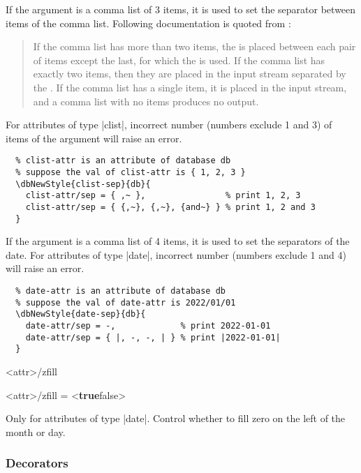 \documentclass[full]{l3doc}
\def\orbar{\textup{\textbar}}
\def\defaultval#1{\textbf{\textup{#1}}}
\def\TTF{\defaultval{true}\orbar false}
\begin{document}
\begin{documentation}
  If the argument is a comma list of 3 items, it is used to set the separator
  between items of the comma list. Following documentation is quoted from
  :
  \begin{quote}
    If the comma list has more than two items, the  is placed between each pair of items except the last, for
    which the  is used. If the comma list
    has exactly two items, then they are placed in the input stream separated
    by the . If the comma list has a single item,
    it is placed in the input stream, and a comma list with no items produces
    no output.
  \end{quote}
  For attributes of type |clist|, incorrect number (numbers exclude 1 and 3)
  of items of the argument will raise an error.

\begin{verbatim}
  % clist-attr is an attribute of database db
  % suppose the val of clist-attr is { 1, 2, 3 }
  \dbNewStyle{clist-sep}{db}{
    clist-attr/sep = { ,~ },                % print 1, 2, 3
    clist-attr/sep = { {,~}, {,~}, {and~} } % print 1, 2 and 3
  }
\end{verbatim}

  If the argument is a comma list of 4 items, it is used to set the separators
  of the date. For attributes of type |date|, incorrect number (numbers
  exclude 1 and 4) will raise an error.

\begin{verbatim}
  % date-attr is an attribute of database db
  % suppose the val of date-attr is 2022/01/01
  \dbNewStyle{date-sep}{db}{
    date-attr/sep = -,             % print 2022-01-01
    date-attr/sep = { |, -, -, | } % print |2022-01-01|
  }
\end{verbatim}

\begin{option}[added=2022-01-08, EXP]{<attr>/zfill}
  \begin{syntax}
    <attr>/zfill = <\TTF>
  \end{syntax}

  Only for attributes of type |date|. Control whether to fill zero on the left
  of the month or day.
\end{option}

\subsubsection{Decorators}


\end{documentation}
\end{document}

